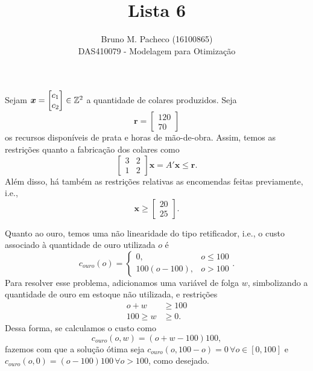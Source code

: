 \documentclass[a4paper]{report}
\begin{document}
 
\title{Lista 6}
\author{Bruno M. Pacheco (16100865)\\
DAS410079 - Modelagem para Otimização}
 
\maketitle
 

Sejam $\bm{x} = \begin{bmatrix} c_1 \\ c_2 \end{bmatrix}  \in \mathbb{Z}^2$ a quantidade de colares produzidos. Seja \[
\bm{r} = \begin{bmatrix} 120 \\ 70 \end{bmatrix} 
\] os recursos disponíveis de prata e horas de mão-de-obra. Assim, temos as restrições quanto a fabricação dos colares como \[
\begin{bmatrix}
    3 & 2 \\
    1 & 2
\end{bmatrix}\bm{x} = A' \bm{x} \le \bm{r}
.\] Além disso, há também as restrições relativas as encomendas feitas previamente, i.e., \[
\bm{x} \ge \begin{bmatrix} 20 \\ 25 \end{bmatrix} 
.\] 

Quanto ao ouro, temos uma não linearidade do tipo retificador, i.e., o custo associado à quantidade de ouro utilizada $o$ é \[
c_{ouro}\left( o \right) = \begin{cases}
    0, & o \le 100 \\
    100 \left( o-100 \right) , & o > 100
\end{cases}
.\] Para resolver esse problema, adicionamos uma variável de folga $w$, simbolizando a quantidade de ouro em estoque não utilizada, e restrições
\begin{align*}
    o + w &\ge 100 \\
    100 \ge w &\ge 0
.\end{align*}
Dessa forma, se calculamos o custo como \[
c_{ouro}\left( o, w \right) = \left( o+w -100\right) 100
,\] fazemos com que a solução ótima seja $c_{ouro}\left( o,100-o \right) = 0\, \forall o \in \left[ 0,100 \right] $ e $c_{ouro}\left( o,0 \right) = \left( o-100 \right) 100\, \forall o>100$, como desejado.
\end{document}
